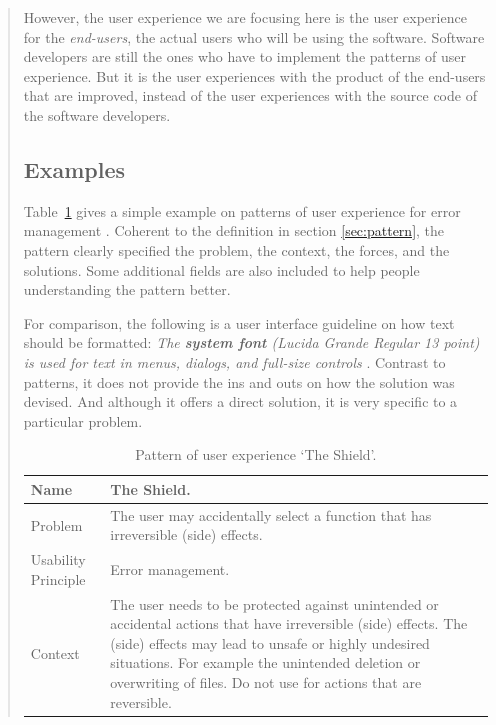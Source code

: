 \documentclass[a4paper,titlepage]{article}
\begin{document}
\begin{quote}
However, the user experience we are focusing here is the user
experience for the \textit{end-users}, the actual users who will be
using the software. Software developers are still the ones who have to
implement the patterns of user experience. But it is the user
experiences with the product of the end-users that are improved,
instead of the user experiences with the source code of the software
developers.

\subsection{Examples}
Table~\ref{tab:shield} gives a simple example on patterns of user
experience for error management \citep{patterns:welie}. Coherent to
the definition in section \ref{sec:pattern}, the pattern clearly
specified the problem, the context, the forces, and the
solutions. Some additional fields are also included to help people
understanding the pattern better.

For comparison, the following is a user interface guideline on how
text should be formatted: \textit{The \textbf{system font} (Lucida
  Grande Regular 13 point) is used for text in menus, dialogs, and
  full-size controls} \citep{hig:apple}. Contrast to patterns, it does
not provide the ins and outs on how the solution was devised. And
although it offers a direct solution, it is very specific to a
particular problem.

\begin{table}[!t]
  \caption{Pattern of user experience `The Shield'.}
  \label{tab:shield}
  \begin{center}
    \begin{tabular}{| p{} || p{} |}
      \hline
      Name & The Shield. \\ \hline

      Problem & The user may accidentally select a function that has
      irreversible (side) effects. \\ \hline

      Usability Principle & Error management. \\ \hline

      Context & The user needs to be protected against unintended or
      accidental actions that have irreversible (side) effects. The
      (side) effects may lead to unsafe or highly undesired
      situations. For example the unintended deletion or overwriting
      of files. Do not use for actions that are reversible. \\ \hline


\end{tabular}
\end{center}
\end{table}
\end{quote}
\end{document}
